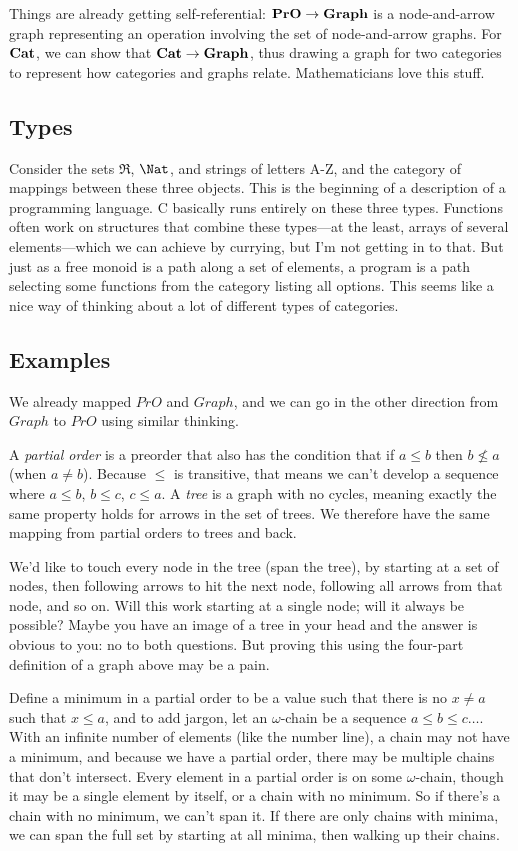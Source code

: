 \documentclass[11pt]{article}
\begin{document}
Things are already getting self-referential: ${\bf PrO}\to {\bf Graph}$ is a
node-and-arrow graph representing an operation involving the set of node-and-arrow
graphs. For ${\bf Cat}$, we can show that ${\bf Cat}\to {\bf Graph}$, thus drawing a
graph for two categories to represent how categories and graphs relate.  Mathematicians
love this stuff.

\subsection{Types} Consider the sets $\Re$, $\Nat$, and strings of letters A-Z, and the
category of mappings between these three objects. This is the beginning of a description
of a programming language. C basically runs entirely on these three types. Functions often
work on structures that combine these types---at the least, arrays of several
elements---which we can achieve by currying, but I'm not getting in to that. But just as a
free monoid is a path along a set of elements, a program is a path selecting some
functions from the category listing all options. This seems like a nice way of thinking
about a lot of different types of categories.


\subsection{Examples} We already mapped $PrO$ and $Graph$, and we can go in the other
direction from $Graph$ to $PrO$ using similar thinking.

A {\em partial order} is a preorder that also has the condition that if $a\leq b$ then
$b\not\leq a$ (when $a\neq b$). Because $\leq$ is transitive, that means we can't
develop a sequence where $a\leq b$, $b\leq c$, $c\leq a$.
A {\em tree} is a graph with no cycles, meaning exactly the same property holds for arrows
in the set of trees. We therefore have the same mapping from partial orders to trees and
back.

We'd like to touch every node in the tree (span the tree), by starting at a set of
nodes, then following arrows to hit the next node, following all arrows from that node, and so on.
Will this work starting at a single node; will it always be possible? Maybe you have an
image of a tree in your head and the answer is obvious to you: no to both questions.
But proving this using the four-part definition of a graph above may be a pain.

Define a minimum in a partial order to be a value such that there is no $x\neq a$ such that
$x\leq a$, and to add jargon, let an $\omega$-chain be a sequence $a\leq b\leq
c\dots$. With an infinite number of elements (like the number line), a chain may not have
a minimum, and because we have a partial order, there may be multiple chains that don't
intersect. Every element in a partial order is on some $\omega$-chain, though it may be a
single element by itself, or a chain with no minimum. So if there's a chain with no
minimum, we can't span it.  If there are only chains with minima, we can span the full
set by starting at all minima, then walking up their chains.
\end{document}
